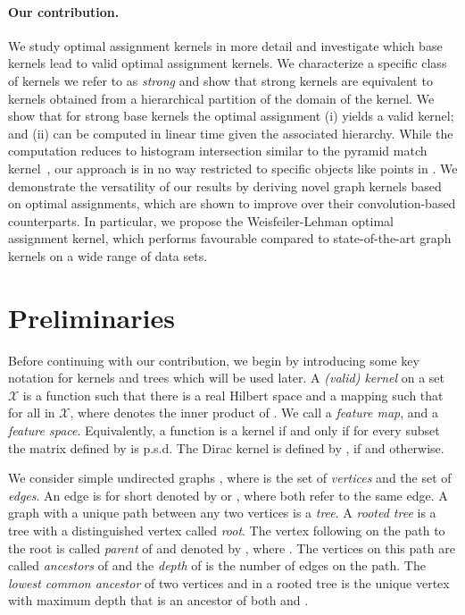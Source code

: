 \documentclass{article}
\newcommand{\X}{\ensuremath{\mathcal{X}}\xspace}
\begin{document}
\paragraph{Our contribution.}
We study optimal assignment kernels in more detail and investigate which base 
kernels lead to valid optimal assignment kernels. We characterize a specific 
class of kernels we refer to as \emph{strong} and show that strong kernels are 
equivalent to kernels obtained from a hierarchical partition of the domain 
of the kernel. We show that for strong base kernels the optimal assignment 
(i) yields a valid kernel; and (ii) can be computed in linear time given the
associated hierarchy.
While the computation reduces to histogram intersection similar to the
pyramid match kernel~\cite{Grauman2007}, our approach is in no way restricted 
to specific objects like points in . We demonstrate the versatility
of our results by deriving novel graph kernels based on optimal assignments, 
which are shown to improve over their convolution-based counterparts.
In particular, we propose the Weisfeiler-Lehman optimal assignment kernel, which
performs favourable compared to state-of-the-art graph kernels on a wide range 
of data sets.



\section{Preliminaries}
Before continuing with our contribution, we begin by introducing some key notation
for kernels and trees which will be used later.
A \emph{(valid) kernel} on a set \X is a function 
 such that there is a real 
Hilbert space  and a mapping  
such that  for all  in \X, 
where  denotes the inner product of . 
We call  a \emph{feature map}, and  a \emph{feature space}. 
Equivalently, a function  is a kernel
if and only if for every subset  the 
 matrix defined by  is p.s.d.
The Dirac kernel  is defined by , if  and  
otherwise.


We consider simple undirected graphs , where  is the set of 
\emph{vertices} and  the set of \emph{edges}. An edge  is for
short denoted by  or , where both refer to the same edge.
A graph with a unique path between any two vertices is a \emph{tree}.
A \emph{rooted tree} is a tree  with a distinguished vertex  
called \emph{root}.
The vertex following  on the path to the root  is called \emph{parent} of 
 and denoted by , where .
The vertices on this path are called \emph{ancestors} of  and the \emph{depth} 
of  is the number of edges on the path.
The \emph{lowest common ancestor}  of two vertices  and  
in a rooted tree is the unique vertex with maximum depth that is an ancestor of
both  and .
\end{document}

